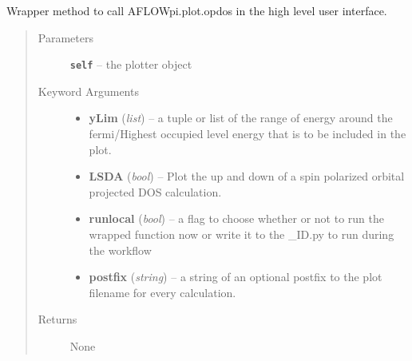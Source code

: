 \documentclass[letterpaper,10pt,english]{sphinxmanual}
\begin{document}
\begin{fulllineitems}
\begin{fulllineitems}
\end{fulllineitems}


\begin{fulllineitems}
\label{prep:prep.plotter.opdos}
Wrapper method to call AFLOWpi.plot.opdos in the high level user interface.
\begin{quote}\begin{description}
\item[{Parameters}] \leavevmode
\textbf{\texttt{self}} -- the plotter object

\item[{Keyword Arguments}] \leavevmode\begin{itemize}
\item {} 
\textbf{yLim} (\emph{list}) --
a tuple or list of the range of energy around the fermi/Highest
occupied level energy that is to be included in the plot.

\item {} 
\textbf{LSDA} (\emph{bool}) --
Plot the up and down of a spin polarized orbital projected DOS
calculation.

\item {} 
\textbf{runlocal} (\emph{bool}) --
a flag to choose whether or not to run the wrapped function now
or write it to the \_ID.py to run during the workflow

\item {} 
\textbf{postfix} (\emph{string}) --
a string of an optional postfix to the plot filename for every
calculation.

\end{itemize}

\item[{Returns}] \leavevmode
None

\end{description}\end{quote}

\end{fulllineitems}


\begin{fulllineitems}
\label{prep:prep.plotter.phonon}
\end{fulllineitems}


\end{fulllineitems}
\end{document}

